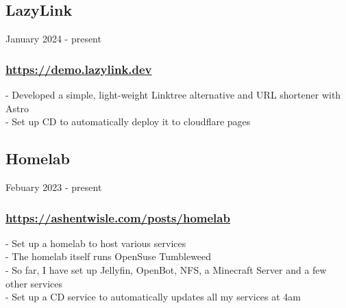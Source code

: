 \subsection{LazyLink} January 2024 - present \\
\subsubsection{\href{https://demo.lazylink.dev}{https://demo.lazylink.dev}}
-\: Developed a simple, light-weight Linktree alternative and URL shortener with Astro \\
-\: Set up CD to automatically deploy it to cloudflare pages \\

\subsection{Homelab} Febuary 2023 - present \\
\subsubsection{\href{https://ashentwisle.com/posts/homelab-go-brrr}{https://ashentwisle.com/posts/homelab}}
-\:  Set up a homelab to host various services \\
-\:  The homelab itself runs OpenSuse Tumbleweed \\
-\:  So far, I have set up Jellyfin, OpenBot, NFS, a Minecraft Server and a few other services \\
-\:  Set up a CD service to automatically updates all my services at 4am \\


